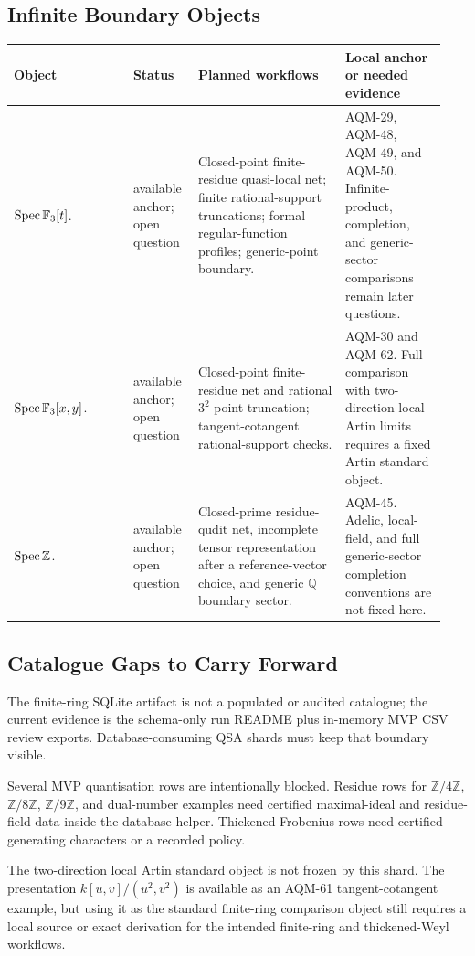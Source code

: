 \subsection{Infinite Boundary Objects}

\begin{center}
\small
\begin{tabular}{p{0.26\linewidth}p{0.14\linewidth}p{0.32\linewidth}p{0.22\linewidth}}
\toprule
Object & Status & Planned workflows & Local anchor or needed evidence\\
\midrule
\(\operatorname{Spec}\mathbb F_3[t]\). & available anchor; open question & Closed-point finite-residue quasi-local net; finite rational-support truncations; formal regular-function profiles; generic-point boundary. & AQM-29, AQM-48, AQM-49, and AQM-50.  Infinite-product, completion, and generic-sector comparisons remain later questions.\\
\(\operatorname{Spec}\mathbb F_3[x,y]\). & available anchor; open question & Closed-point finite-residue net and rational \(3^2\)-point truncation; tangent-cotangent rational-support checks. & AQM-30 and AQM-62.  Full comparison with two-direction local Artin limits requires a fixed Artin standard object.\\
\(\operatorname{Spec}\mathbb Z\). & available anchor; open question & Closed-prime residue-qudit net, incomplete tensor representation after a reference-vector choice, and generic \(\mathbb Q\) boundary sector. & AQM-45.  Adelic, local-field, and full generic-sector completion conventions are not fixed here.\\
\bottomrule
\end{tabular}
\end{center}

\subsection{Catalogue Gaps to Carry Forward}

The finite-ring SQLite artifact is not a populated or audited catalogue; the
current evidence is the schema-only run README plus in-memory MVP CSV review
exports.  Database-consuming QSA shards must keep that boundary visible.

Several MVP quantisation rows are intentionally blocked.  Residue rows for
\(\mathbb Z/4\mathbb Z\), \(\mathbb Z/8\mathbb Z\), \(\mathbb Z/9\mathbb Z\),
and dual-number examples need certified maximal-ideal and residue-field data
inside the database helper.  Thickened-Frobenius rows need certified
generating characters or a recorded policy.

The two-direction local Artin standard object is not frozen by this shard.
The presentation \(k[u,v]/(u^2,v^2)\) is available as an AQM-61
tangent-cotangent example, but using it as the standard finite-ring comparison
object still requires a local source or exact derivation for the intended
finite-ring and thickened-Weyl workflows.
